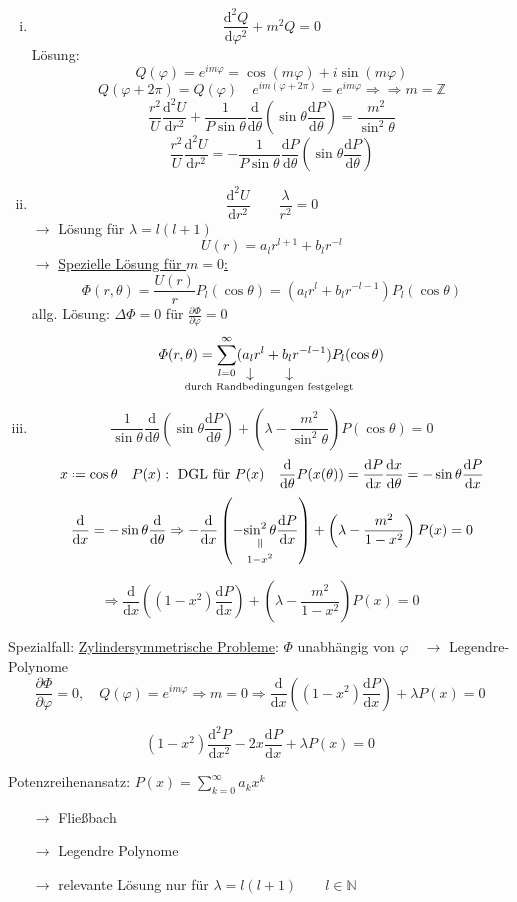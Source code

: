 \documentclass[titlepage,11pt,a4paper,ngerman]{report}
\newcommand*{\defeq}{\mathrel{\vcenter{\baselineskip0.5ex \lineskiplimit0pt \hbox{\scriptsize.}\hbox{\scriptsize.}}}=}
\newcommand{\verteq}{\rotatebox{90}{$\,=$}}
\newcommand{\equalto}[2]{\underset{\scriptstyle\overset{\mkern4mu\verteq}{#2}}{#1}}
\newcommand{\custo}[3]{\underset{\scriptstyle\overset{\mkern4mu\rotatebox{-90}{$\,#1$}}{#3}}{#2}}
\newcommand{\prt}[2]{\frac{\partial #1}{\partial #2}}
\renewcommand{\Phi}{\varPhi}
\newcommand{\summ}[2]{\sum_{#1}^{#2}}
\newcommand{\frbox}[2]{\begin{tcolorbox}[colback=white,colframe=red!75!black,fonttitle=\bfseries,title=#1]#2\end{tcolorbox}}
\begin{document}
\begin{enumerate}[i)]
	\item $$\frac{\textrm{d}^2 Q}{\textrm{d} \varphi^2} + m^2 Q = 0$$ Lösung: $$Q(\varphi) = e^{im\varphi} = \cos(m\varphi) + i\sin(m\varphi)$$
	 	$$Q(\varphi + 2 \pi) = Q(\varphi) \quad e^{im(\varphi + 2\pi)} = e^{im\varphi} \Rightarrow \Rightarrow m = \mathbb Z$$
	 	$$\frac{r^2}{U} \frac{\textrm{d}^2 U}{\textrm{d} r^2} + \frac{1}{P\sin\theta} \frac{\textrm{d}}{\textrm{d} \theta}\left( \sin\theta \frac{\textrm{d}P}{\textrm{d}\theta} \right) = \frac{m^2}{\sin^2\theta}$$
	 	$$\frac{r^2}{U} \frac{\textrm{d}^2 U}{\textrm{d} r^2} = - \frac{1}{P\sin\theta}\frac{\textrm{d} P}{\textrm{d} \theta}\left( \sin\theta \frac{\textrm{d}P}{\textrm{d}\theta} \right)$$ %
	 \item $$\frac{\textrm{d}^2 U}{\textrm{d} r^2}\qquad \frac{\lambda}{r^2} = 0$$
	 	$\rightarrow$ Lösung für $\lambda = l(l + 1)$
	 	$$U(r) = a_l r^{l + 1} + b_l r^{-l}$$
	 	$\rightarrow$ \underline{Spezielle Lösung für $m = 0$:}
	 	$$\Phi(r,\theta) = \frac{U(r)}{r}P_l (\cos\theta) = (a_l r^l + b_l r^{-l - 1}) P_l (\cos\theta)$$
	 	allg. Lösung: $\Delta\Phi = 0$ für $\prt{\Phi}{\varphi} = 0$
	 	$$\Phi(r,\theta) = \summ{l = 0}{\infty} (\custo{\to}{a_l}{\mathclap{\hspace{30pt}\textrm{durch Randbedingungen festgelegt}}} r^l + \custo{\to}{b_l}{} r^{-l - 1}) P_l(\cos\theta)$$
	 \item $$\frac{1}{\sin\theta} \frac{\textrm{d}}{\textrm{d} \theta}\left( \sin\theta \frac{\textrm{d}P}{\textrm{d}\theta}\right) + \left(\lambda - \frac{m^2}{\sin^2\theta}\right)P(\cos\theta) = 0$$
	 	$$x \defeq \cos\theta \quad P(x): \textrm{ DGL für } P(x) \quad \frac{\textrm{d}}{\textrm{d} \theta} P(x(\theta)) = \frac{\textrm{d}P}{\textrm{d}x} \frac{\textrm{d}x}{\textrm{d}\theta} = -\sin \theta \frac{\textrm{d}P}{\textrm{d}x}$$
	 	$$\frac{\textrm{d}}{\textrm{d} x} = -\sin\theta \frac{\textrm{d}}{\textrm{d}\theta} \Rightarrow - \frac{\textrm{d}}{\textrm{d}x} \left( - \equalto{\sin^2\theta}{1 - x^2} \frac{\textrm{d}P}{\textrm{d}x} \right) + \left(\lambda - \frac{m^2}{1-x^2}\right) P(x) = 0$$
\end{enumerate}
\frbox{Zugeordnete Legendresche DGL}{$$\Rightarrow \frac{\textrm{d}}{\textrm{d}x} \left( (1-x^2) \frac{\textrm{d}P}{\textrm{d}x} \right) + \left( \lambda - \frac{m^2}{1 - x^2} \right) P(x) = 0$$} %
Spezialfall: \underline{Zylindersymmetrische Probleme}: $\Phi$ unabhängig von $\varphi\quad \rightarrow$ Legendre-Polynome
$$\prt{\Phi}{\varphi}= 0, \quad Q(\varphi) = e^{im\varphi} \Rightarrow m = 0 \Rightarrow \frac{\textrm{d}}{\textrm{d}x}\left( (1 - x^2) \frac{\textrm{d}P}{\textrm{d}x} \right) + \lambda P (x) = 0$$
\frbox{Legendresche DGL}{$$(1-x^2) \frac{\textrm{d}^2P}{\textrm{d}x^2} - 2x \frac{\textrm{d}P}{\textrm{d}x} + \lambda P(x) = 0$$}
Potenzreihenansatz: $P(x) = \summ{k = 0}{\infty} a_k x^k$
\begin{itemize}
	\item[$\rightarrow$] Fließbach
	\item[$\rightarrow$] Legendre Polynome
	\item[$\rightarrow$] relevante Lösung nur für $\lambda = l(l + 1) \qquad l \in \mathbb N$
\end{itemize}
\end{document}
